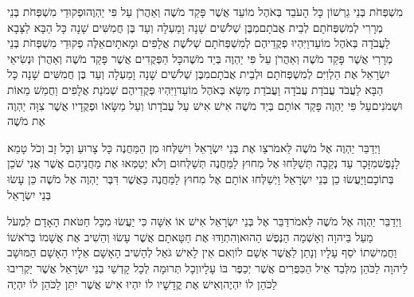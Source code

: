 \documentclass[../main/main.tex]{subfiles}
\begin{document}
\begin{multicols}{\ncols}
מִשְׁפְּחֹת בְּנֵי גֵרְשׁוֹן כָּל הָעֹבֵד בְּאֹהֶל מוֹעֵד אֲשֶׁר פָּקַד מֹשֶׁה וְאַהֲרֹן עַל פִּי יַהְוֶה\PreVerseSpace{}וּפְקוּדֵי מִשְׁפְּחֹת בְּנֵי מְרָרִי לְמִשְׁפְּחֹתָם לְבֵית אֲבֹתָם\PreVerseSpace{}מִבֶּן שְׁלֹשִׁים שָׁנָה וָמַעְלָה וְעַד בֶּן חֲמִשִּׁים שָׁנָה כָּל הַבָּא לַצָּבָא לַעֲבֹדָה בְּאֹהֶל מוֹעֵד\PreVerseSpace{}וַיִּהְיוּ פְקֻדֵיהֶם לְמִשְׁפְּחֹתָם שְׁלֹשֶׁת אֲלָפִים וּמָאתָיִם\PreVerseSpace{}אֵלֶּה פְקוּדֵי מִשְׁפְּחֹת בְּנֵי מְרָרִי אֲשֶׁר פָּקַד מֹשֶׁה וְאַהֲרֹן עַל פִּי יַהְוֶה בְּיַד מֹשֶׁה\PreVerseSpace{}כָּל הַפְּקֻדִים אֲשֶׁר פָּקַד מֹשֶׁה וְאַהֲרֹן וּנְשִׂיאֵי יִשְׂרָאֵל אֶת הַלְוִיִּם לְמִשְׁפְּחֹתָם וּלְבֵית אֲבֹתָם\PreVerseSpace{}מִבֶּן שְׁלֹשִׁים שָׁנָה וָמַעְלָה וְעַד בֶּן חֲמִשִּׁים שָׁנָה כָּל הַבָּא לַעֲבֹד עֲבֹדַת עֲבֹדָה וַעֲבֹדַת מַשָּׂא בְּאֹהֶל מוֹעֵד\PreVerseSpace{}וַיִּהְיוּ פְּקֻדֵיהֶם שְׁמֹנַת אֲלָפִים וַחֲמֵשׁ מֵאוֹת וּשְׁמֹנִים\PreVerseSpace{}עַל פִּי יַהְוֶה פָּקַד אוֹתָם בְּיַד מֹשֶׁה אִישׁ אִישׁ עַל עֲבֹדָתוֹ וְעַל מַשָּׂאוֹ וּפְקֻדָיו אֲשֶׁר צִוָּה יַהְוֶה אֶת מֹשֶׁה\OpenSection{}\par
{}וַיְדַבֵּר יַהְוֶה אֶל מֹשֶׁה לֵּאמֹר\PreVerseSpace{}צַו אֶת בְּנֵי יִשְׂרָאֵל וִישַׁלְּחוּ מִן הַמַּחֲנֶה כָּל צָרוּעַ וְכָל זָב וְכֹל טָמֵא לָנָפֶשׁ\PreVerseSpace{}מִזָּכָר עַד נְקֵבָה תְּשַׁלֵּחוּ אֶל מִחוּץ לַמַּחֲנֶה תְּשַׁלְּחוּם וְלֹא יְטַמְּאוּ אֶת מַחֲנֵיהֶם אֲשֶׁר אֲנִי שֹׁכֵן בְּתוֹכָם\PreVerseSpace{}וַיַּעֲשׂוּ כֵן בְּנֵי יִשְׂרָאֵל וַיְשַׁלְּחוּ אוֹתָם אֶל מִחוּץ לַמַּחֲנֶה כַּאֲשֶׁר דִּבֶּר יַהְוֶה אֶל מֹשֶׁה כֵּן עָשׂוּ בְּנֵי יִשְׂרָאֵל\OpenSection{}\par
{}וַיְדַבֵּר יַהְוֶה אֶל מֹשֶׁה לֵּאמֹר\PreVerseSpace{}דַּבֵּר אֶל בְּנֵי יִשְׂרָאֵל אִישׁ אוֹ אִשָּׁה כִּי יַעֲשׂוּ מִכָּל חַטֹּאת הָאָדָם לִמְעֹל מַעַל בַּיהוָה וְאָשְׁמָה הַנֶּפֶשׁ הַהוּא\PreVerseSpace{}וְהִתְוַדּוּ אֶת חַטָּאתָם אֲשֶׁר עָשׂוּ וְהֵשִׁיב אֶת אֲשָׁמוֹ בְּרֹאשׁוֹ וַחֲמִישִׁתוֹ יֹסֵף עָלָיו וְנָתַן לַאֲשֶׁר אָשַׁם לוֹ\PreVerseSpace{}וְאִם אֵין לָאִישׁ גֹּאֵל לְהָשִׁיב הָאָשָׁם אֵלָיו הָאָשָׁם הַמּוּשָׁב לַיהוָה לַכֹּהֵן מִלְּבַד אֵיל הַכִּפֻּרִים אֲשֶׁר יְכַפֶּר בּוֹ עָלָיו\PreVerseSpace{}וְכָל תְּרוּמָה לְכָל קָדְשֵׁי בְנֵי יִשְׂרָאֵל אֲשֶׁר יַקְרִיבוּ לַכֹּהֵן לוֹ יִהְיֶה\PreVerseSpace{}וְאִישׁ אֶת קֳדָשָׁיו לוֹ יִהְיוּ אִישׁ אֲשֶׁר יִתֵּן לַכֹּהֵן לוֹ יִהְיֶה\OpenSection{}\par

\end{multicols}
\end{document}

